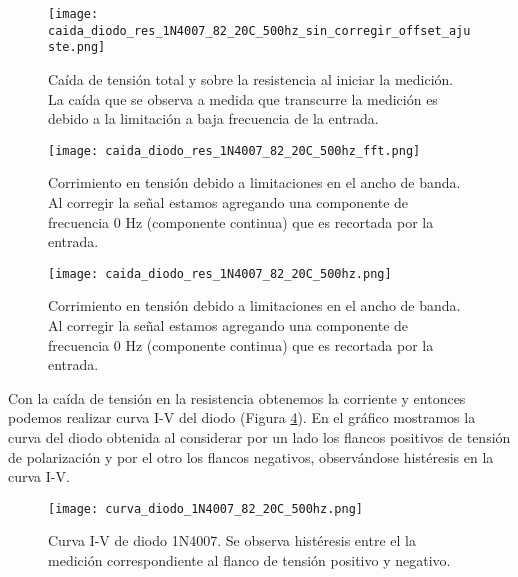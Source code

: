 \documentclass[a4paper, 11pt]{article}
\begin{document}
\begin{figure} [H]
\centering
\texttt{[image: caida\_diodo\_res\_1N4007\_82\_20C\_500hz\_sin\_corregir\_offset\_ajuste.png]}
\caption{Caída de tensión total y sobre la resistencia al iniciar la medición. La caída que se observa a medida que transcurre la medición es debido a la limitación a baja frecuencia de la entrada. \label{fig:caida_diodo_res_1N4007_82_20C_500hz_sin_corregir_offset_ajuste}}
\end{figure} 

\begin{figure} [H]
\centering
\texttt{[image: caida\_diodo\_res\_1N4007\_82\_20C\_500hz\_fft.png]}
\caption{Corrimiento en tensión debido a limitaciones en el ancho de banda. Al corregir la señal estamos agregando una componente de frecuencia 0 Hz (componente continua) que es recortada por la entrada. \label{fig:caida_diodo_res_1N4007_82_20C_500hz_fft}}
\end{figure} 

\begin{figure} [H]
\centering
\texttt{[image: caida\_diodo\_res\_1N4007\_82\_20C\_500hz.png]}
\caption{Corrimiento en tensión debido a limitaciones en el ancho de banda. Al corregir la señal estamos agregando una componente de frecuencia 0 Hz (componente continua) que es recortada por la entrada. \label{fig:caida_diodo_res_1N4007_82_20C_500hz}}
\end{figure} 

Con la caída de tensión en la resistencia obtenemos la corriente y entonces podemos realizar curva I-V del diodo (Figura \ref{fig:curva_diodo_1N4007_82_20C_500hz}). En el gráfico mostramos la curva del diodo obtenida al considerar por un lado los flancos positivos de tensión de polarización y por el otro los flancos negativos, observándose histéresis en la curva I-V. 

\begin{figure} [H]
\centering
\texttt{[image: curva\_diodo\_1N4007\_82\_20C\_500hz.png]}
\caption{Curva I-V de diodo 1N4007. Se observa histéresis entre el la medición correspondiente al flanco de tensión positivo y negativo. \label{fig:curva_diodo_1N4007_82_20C_500hz}}
\end{figure} 

\end{document}
